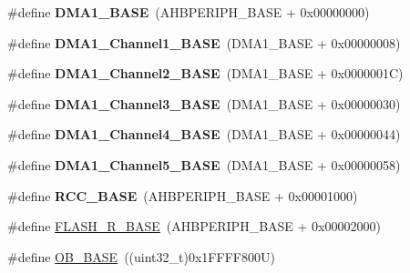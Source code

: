 \begin{DoxyCompactItemize}
\item 
\mbox{\label{group___peripheral__memory__map_gab2d8a917a0e4ea99a22ac6ebf279bc72}} 
\#define {\bfseries D\+M\+A1\+\_\+\+B\+A\+SE}~(A\+H\+B\+P\+E\+R\+I\+P\+H\+\_\+\+B\+A\+SE + 0x00000000)
\item 
\mbox{\label{group___peripheral__memory__map_ga888dbc1608243badeb3554ffedc7364c}} 
\#define {\bfseries D\+M\+A1\+\_\+\+Channel1\+\_\+\+B\+A\+SE}~(D\+M\+A1\+\_\+\+B\+A\+SE + 0x00000008)
\item 
\mbox{\label{group___peripheral__memory__map_ga38a70090eef3687e83fa6ac0c6d22267}} 
\#define {\bfseries D\+M\+A1\+\_\+\+Channel2\+\_\+\+B\+A\+SE}~(D\+M\+A1\+\_\+\+B\+A\+SE + 0x0000001\+C)
\item 
\mbox{\label{group___peripheral__memory__map_ga70b3d9f36ca9ce95b4e421c11154fe5d}} 
\#define {\bfseries D\+M\+A1\+\_\+\+Channel3\+\_\+\+B\+A\+SE}~(D\+M\+A1\+\_\+\+B\+A\+SE + 0x00000030)
\item 
\mbox{\label{group___peripheral__memory__map_ga1adc93cd0baf0897202c71110e045692}} 
\#define {\bfseries D\+M\+A1\+\_\+\+Channel4\+\_\+\+B\+A\+SE}~(D\+M\+A1\+\_\+\+B\+A\+SE + 0x00000044)
\item 
\mbox{\label{group___peripheral__memory__map_gac041a71cd6c1973964f847a68aa14478}} 
\#define {\bfseries D\+M\+A1\+\_\+\+Channel5\+\_\+\+B\+A\+SE}~(D\+M\+A1\+\_\+\+B\+A\+SE + 0x00000058)
\item 
\mbox{\label{group___peripheral__memory__map_ga0e681b03f364532055d88f63fec0d99d}} 
\#define {\bfseries R\+C\+C\+\_\+\+B\+A\+SE}~(A\+H\+B\+P\+E\+R\+I\+P\+H\+\_\+\+B\+A\+SE + 0x00001000)
\item 
\#define \hyperlink{group___peripheral__memory__map_ga8e21f4845015730c5731763169ec0e9b}{F\+L\+A\+S\+H\+\_\+\+R\+\_\+\+B\+A\+SE}~(A\+H\+B\+P\+E\+R\+I\+P\+H\+\_\+\+B\+A\+SE + 0x00002000)
\item 
\#define \hyperlink{group___peripheral__memory__map_gab5b5fb155f9ee15dfb6d757da1adc926}{O\+B\+\_\+\+B\+A\+SE}~((uint32\+\_\+t)0x1\+F\+F\+F\+F800\+U)

\end{DoxyCompactItemize}
